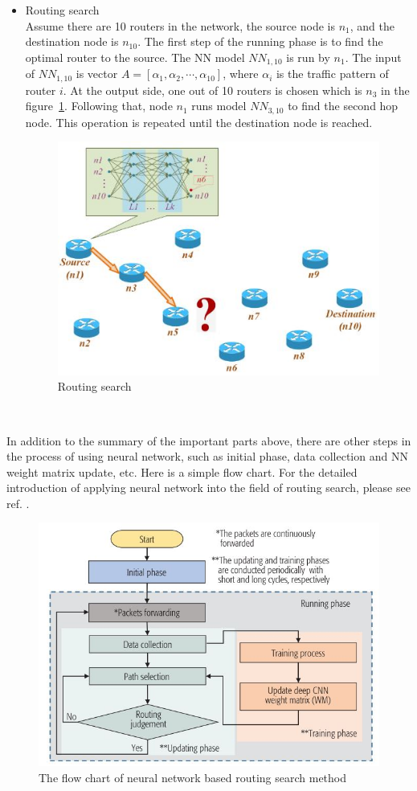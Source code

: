 \documentclass[11pt]{report}
\begin{document}
	\begin{itemize}
		\item Routing search\\
		Assume there are 10 routers in the network, the source node is $n_1$, and the destination node is $n_10$. The first step of the running phase is to find the optimal router to the source. The NN model $NN_{1,10}$ is run by $n_1$. The input of $NN_{1,10}$ is vector $A=\left[\alpha_1, \alpha_2,\cdots, \alpha_10\right]$, where $\alpha_i$ is the traffic pattern of router $i$. At the output side, one out of 10 routers is chosen which is $n_3$ in the figure~\ref{4thfig}. Following that, node $n_1$ runs model $NN_{3,10}$ to find the second hop node. This operation is repeated until the destination node is reached.\\
		\begin{figure}[h!]
			\centering
			\includegraphics[width=0.6\linewidth]{figure6.jpg}
			\caption{Routing search}
			\label{4thfig}
		\end{figure}\\ 
	\end{itemize}
        
    \noindent In addition to the summary of the important parts above, there are other steps in the process of using neural network, such as initial phase, data collection and NN weight matrix update, etc. Here is a simple flow chart. For the detailed introduction of applying neural network into the field of routing search, please see ref. \cite{7792369}.
    \begin{figure}[h!]
    	\centering
    	\includegraphics[width=0.6\linewidth]{figure7.jpg}
    	\caption{The flow chart of neural network based routing search method}
    	\label{5thfig}   
    \end{figure}\\ 
\end{document}
